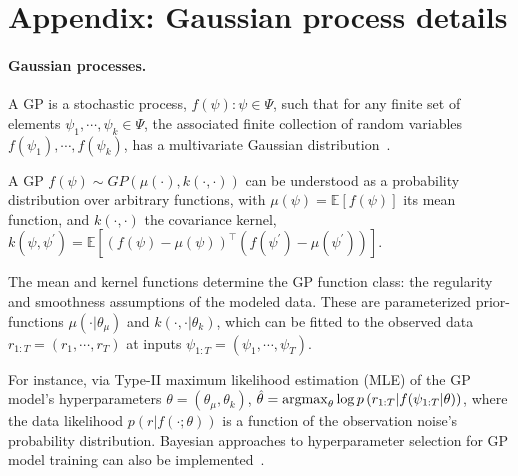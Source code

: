 \appendix

\clearpage
\section{Appendix: Gaussian process details}
\label{asec:GP_details}

\paragraph*{Gaussian processes.}\hspace*{-2ex}
A GP is a stochastic process, ${f(\psi) : \psi \in \Psi }$, such that
for any finite set of elements $\psi_1, \cdots , \psi_k \in \Psi$,
the associated finite collection of random variables $f(\psi_1), \cdots, f(\psi_k)$, 
has a multivariate Gaussian distribution~\citep{b-Rasmussen2005}.

A GP $f(\psi) \sim GP(\mu(\cdot), k(\cdot,\cdot))$ can be understood as a probability distribution over arbitrary functions, with $\mu(\psi) = \mathbb{E}[f(\psi)]$ its mean function, and $k(\cdot, \cdot)$ the covariance kernel, \ie $k(\psi, \psi^\prime)=\mathbb{E}[(f(\psi)-\mu(\psi))^\top(f(\psi^\prime)-\mu(\psi^\prime))]$.

The mean and kernel functions determine the GP function class: \ie the regularity and smoothness assumptions of the modeled data.
These are parameterized prior-functions $\mu(\cdot|\theta_{\mu})$ and $k(\cdot, \cdot|\theta_k)$,
which can be fitted to the observed data $r_{1:T} = (r_1, \cdots, r_T)$ at inputs $\psi_{1:T} = (\psi_1, \cdots, \psi_T)$.

For instance, via Type-II maximum likelihood estimation (MLE) of the GP model's hyperparameters $\theta=(\theta_{\mu}, \theta_k)$,
$
\hat{\theta} =\argmax_{\theta} \log p\left(r_{1:T}|f(\psi_{1:T} | \theta) \right) %
$,
where the data likelihood $p(r|f (\cdot; \theta))$ is a function of the observation noise's probability distribution.
Bayesian approaches to hyperparameter selection for GP model training can also be implemented~\citep{b-Rasmussen2005}.

